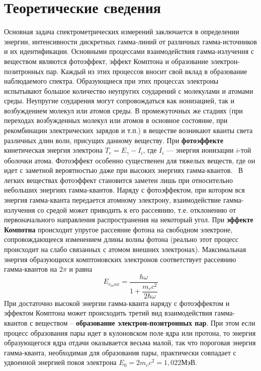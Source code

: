 \documentclass[a4paper,12pt]{article} %
\begin{document}
	\section{Теоретические сведения}
		Основная задача спектрометрических измерений заключается в определении энергии, интенсивности дискретных гамма-линий от различных гамма-источников и их идентификации.
		Основными процессами взаимодействия гамма-излучения с веществом являются фотоэффект, эффект Комптона и образование электрон-позитронных пар. 
		Каждый из этих процессов вносит свой вклад в образование наблюдаемого спектра. Образующиеся при этих процессах электроны испытывают большое количество неупругих соударений с молекулами и атомами среды. 
		Неупругие соударения могут сопровождаться как ионизацией, так и возбуждением молекул или атомов среды. 
		В промежуточных же стадиях (при переходах возбужденных молекул или атомов в основное состояние, при рекомбинации электрических зарядов и т.п.) в веществе возникают кванты света различных длин волн, присущих данному веществу.
		При \textbf{фотоэффекте} кинетическая энергия электрона $ T_e = E_\gamma - I_i $, где $ I_i $ --- энергия ионизации $ i $-той оболочки атома. 
		Фотоэффект особенно существенен для тяжелых веществ, где он идет с заметной вероятностью даже при высоких энергиях гамма-квантов. \
		В легких веществах фотоэффект становится заметен лишь при относительно небольших энергиях гамма-квантов. 
		Наряду с фотоэффектом, при котором вся энергия гамма-кванта передается атомному электрону, взаимодействие гамма-излучения со средой может приводить к его рассеянию, т.е. отклонению от первоначального направления распространения на некоторый угол.
		При \textbf{эффекте Компотна} происходит упругое рассеяние фотона на свободном электроне, сопровождающееся изменением длины волны фотона (реально этот процесс происходит на слабо связанных с атомом внешних электронах). 
		Максимальная энергия образующихся комптоновских электронов соответствует рассеянию гамма-квантов на $ 2\pi $ и равна
		\begin{equation}\label{E_compton}
			E_{c_max} = \dfrac{\hbar \omega}{1 + \dfrac{m_ec^2}{2\hbar\omega}}
		\end{equation}
		При достаточно высокой энергии гамма-кванта наряду с фотоэффектом и эффектом Комптона может происходить третий вид взаимодействия гамма-квантов с веществом – \textbf{образование электрон-позитронных пар}. 
		При этом если процесс образования пары идет в кулоновском поле ядра или протона, то энергия образующегося ядра отдачи оказывается весьма малой, так что пороговая энергия гамма-кванта, необходимая для образования пары, практически совпадает с удвоенной энергией покоя электрона $ E_0 = 2m_ec^2 =1,022  $МэВ.
\end{document}
